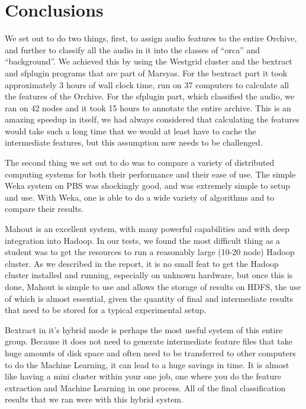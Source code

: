 \documentclass[12pt,oneside]{book}
\begin{document}
\section{Conclusions}

We set out to do two things, first, to assign audio features to the
entire Orchive, and further to classify all the audio in it into the
classes of ``orca'' and ``background''.  We achieved this by using the
Westgrid cluster and the bextract and sfplugin programs that are part
of Marsyas.  For the bextract part it took approximately 3 hours of
wall clock time, run on 37 computers to calculate all the features of
the Orchive.  For the sfplugin part, which classified the audio, we
ran on 42 nodes and it took 15 hours to annotate the entire archive.
This is an amazing speedup in itself, we had always considered that
calculating the features would take such a long time that we would at
least have to cache the intermediate features, but this assumption now
needs to be challenged.

The second thing we set out to do was to compare a variety of
distributed computing systems for both their performance and their
ease of use.  The simple Weka system on PBS was shockingly good, and
was extremely simple to setup and use.  With Weka, one is able to do a
wide variety of algorithms and to compare their results.  

Mahout is an excellent system, with many powerful capabilities and
with deep integration into Hadoop.  In our tests, we found the most
difficult thing as a student was to get the resources to run a
reasonably large (10-20 node) Hadoop cluster.  As we described in the
report, it is no small feat to get the Hadoop cluster installed and
running, especially on unknown hardware, but once this is done, Mahout
is simple to use and allows the storage of results on HDFS, the use of
which is almost essential, given the quantity of final and
intermediate results that need to be stored for a typical experimental
setup.  

Bextract in it's hybrid mode is perhaps the most useful system of this
entire group.  Because it does not need to generate intermediate
feature files that take huge amounts of disk space and often need to
be transferred to other computers to do the Machine Learning, it can
lead to a huge savings in time.  It is almost like having a mini
cluster within your one job, one where you do the feature extraction
and Machine Learning in one process.  All of the final classification
results that we ran were with this hybrid system.
\end{document}
